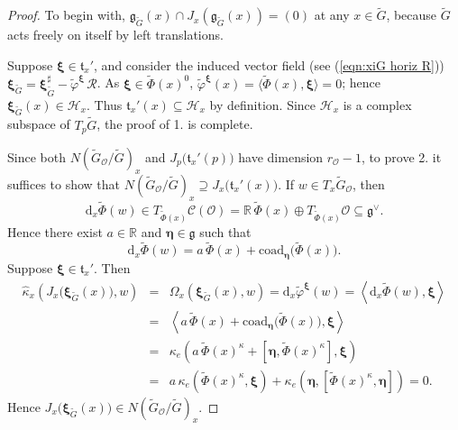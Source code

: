 \documentclass[12pt,a4paper]{article}
\theoremstyle{plain}
\theoremstyle{definition}
\begin{document}
\begin{proof}
To begin with, $\mathfrak{g}_{\tilde{G}}(x)
\cap J_x\left(\mathfrak{g}_{\tilde{G}}(x)\right)=(0)$
at any $x\in \tilde{G}$, because $\tilde{G}$ acts freely on itself
by left translations.

Suppose $\boldsymbol{\xi}\in \mathfrak{t}_x'$, and consider the
induced vector field (see (\ref{eqn:xiG horiz R}))
$\boldsymbol{\xi}_{\tilde{G}}=\boldsymbol{\xi}_{\tilde{G}}^\sharp
-\tilde{\varphi}^{\boldsymbol{\xi}}\,\mathcal{R}$.
As $\boldsymbol{\xi}\in \tilde{\Phi}(x)^0$, 
$\tilde{\varphi}^{\boldsymbol{\xi}}(x)=\langle\tilde{\Phi}(x),\boldsymbol{\xi}\rangle=0$;
hence $\boldsymbol{\xi}_{\tilde{G}}(x)\in \mathcal{H}_x$.
Thus $\mathfrak{t}_x'(x)\subseteq \mathcal{H}_x$ by definition.
Since $\mathcal{H}_x$ is a complex subspace of $T_p\tilde{G}$, the
proof of 1. is complete. 

Since both $N(\tilde{G}_{\mathcal{O}}/\tilde{G})_x$ and $J_p\big(\mathfrak{t}_x'(p)\big)$
have dimension $r_{\mathcal{O}}-1$, to prove 2. it suffices 
to show that $N(\tilde{G}_{\mathcal{O}}/\tilde{G})_x\supseteq J_x\big(\mathfrak{t}_x'(x)\big)$.
If $w\in T_x\tilde{G}_{\mathcal{O}}$, then 
$$
\mathrm{d}_x\tilde{\Phi}(w)\in T_{\tilde{\Phi}(x)}\mathcal{C}(\mathcal{O})=\mathbb{R}\,\tilde{\Phi}(x)\oplus T_{\tilde{\Phi}(x)}\mathcal{O}
\subseteq \mathfrak{g}^\vee.
$$
%
Hence there exist $a\in \mathbb{R}$ and $\boldsymbol{\eta}\in \mathfrak{g}$
such that 
\begin{equation}
\label{eqn:dPhi w}
\mathrm{d}_x\tilde{\Phi}(w)=
a\,\tilde{\Phi}(x)
+\mathrm{coad}_{\boldsymbol{\eta}}\big(\tilde{\Phi}(x)\big).
\end{equation}
%
Suppose $\boldsymbol{\xi}\in \mathfrak{t}_x'$.
%
Then
\begin{eqnarray*}
\hat{\kappa}_x\left(J_x\big(\boldsymbol{\xi}_{\tilde{G}}(x)\big),w\right)
&=&\Omega_x\left(\boldsymbol{\xi}_{\tilde{G}}(x),w\right)
=\mathrm{d}_x\tilde{\varphi}^{\boldsymbol{\xi}}(w)=
\left\langle\mathrm{d}_x\tilde{\Phi}(w),\boldsymbol{\xi}\right\rangle\\
&=&\left\langle a\,\tilde{\Phi}(x)
+\mathrm{coad}_{\boldsymbol{\eta}}\big(\tilde{\Phi}(x)\big),\boldsymbol{\xi}\right\rangle\\
&=&\kappa_e\left(a\,\tilde{\Phi}(x)^\kappa
+\left[\boldsymbol{\eta},\tilde{\Phi}(x)^\kappa\right],\boldsymbol{\xi}\right)\\
&=&a\,\kappa_e\left(\tilde{\Phi}(x)^\kappa,\boldsymbol{\xi}\right)
+\kappa_e\left(\boldsymbol{\eta},
\left[\tilde{\Phi}(x)^\kappa,\boldsymbol{\eta}\right]\right)=0.
\end{eqnarray*}
Hence $J_x\big(\boldsymbol{\xi}_{\tilde{G}}(x)\big)\in 
N(\tilde{G}_{\mathcal{O}}/\tilde{G})_x$.

\end{proof}
\end{document}
